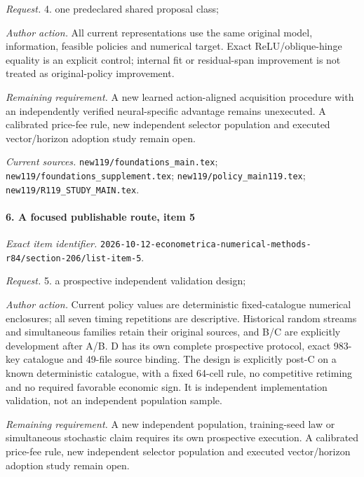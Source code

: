 \par\emph{Request.} 4. one predeclared shared proposal class;

\par\emph{Author action.} All current representations use the same original model, information, feasible policies and numerical target. Exact ReLU/\allowbreak{}oblique-hinge equality is an explicit control; internal fit or residual-span improvement is not treated as original-policy improvement.

\par\emph{Remaining requirement.} A new learned action-aligned acquisition procedure with an independently verified neural-specific advantage remains unexecuted. A calibrated price-fee rule, new independent selector population and executed vector/\allowbreak{}horizon adoption study remain open.

\par\emph{Current sources.} \nolinkurl{new119/foundations_main.tex}; \nolinkurl{new119/foundations_supplement.tex}; \nolinkurl{new119/policy_main119.tex}; \nolinkurl{new119/R119_STUDY_MAIN.tex}.

\paragraph{6. A focused publishable route, item 5}

\emph{Exact item identifier.} \nolinkurl{2026-10-12-econometrica-numerical-methods-r84/section-206/list-item-5}.

\par\emph{Request.} 5. a prospective independent validation design;

\par\emph{Author action.} Current policy values are deterministic fixed-catalogue numerical enclosures; all seven timing repetitions are descriptive. Historical random streams and simultaneous families retain their original sources, and B/\allowbreak{}C are explicitly development after A/\allowbreak{}B. D has its own complete prospective protocol, exact 983-key catalogue and 49-file source binding. The design is explicitly post-C on a known deterministic catalogue, with a fixed 64-cell rule, no competitive retiming and no required favorable economic sign. It is independent implementation validation, not an independent population sample.

\par\emph{Remaining requirement.} A new independent population, training-seed law or simultaneous stochastic claim requires its own prospective execution. A calibrated price-fee rule, new independent selector population and executed vector/\allowbreak{}horizon adoption study remain open.

